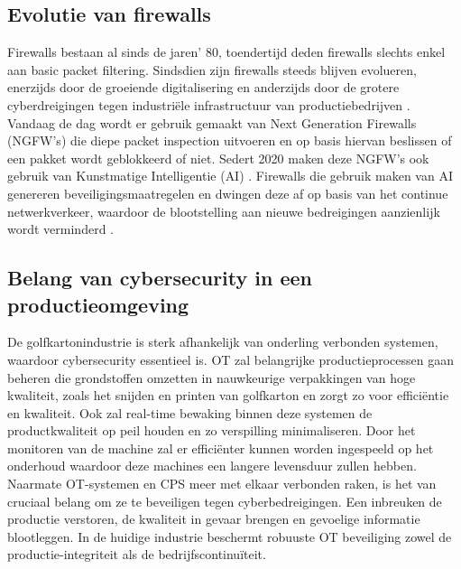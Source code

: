 \subsection{Evolutie van firewalls}
Firewalls bestaan al sinds de jaren’ 80, toendertijd deden firewalls slechts enkel aan basic packet filtering. Sindsdien zijn firewalls steeds blijven evolueren, enerzijds door de groeiende digitalisering en anderzijds door de grotere cyberdreigingen tegen industriële infrastructuur van productiebedrijven \autocite{Wusteney2021}. 
Vandaag de dag wordt er gebruik gemaakt van Next Generation Firewalls (NGFW’s) die diepe packet inspection uitvoeren en op basis hiervan beslissen of een pakket wordt geblokkeerd of niet. Sedert 2020 maken deze NGFW’s ook gebruik van Kunstmatige Intelligentie (AI) \textcite{Ahmadi2023}. Firewalls die gebruik maken van AI genereren beveiligingsmaatregelen en dwingen deze af op basis van het continue netwerkverkeer, waardoor de blootstelling aan nieuwe bedreigingen aanzienlijk wordt verminderd \textcite{PaloAltoFW2024}.

  
\subsection{Belang van cybersecurity in een productieomgeving}

De golfkartonindustrie is sterk afhankelijk van onderling verbonden systemen, waardoor cybersecurity essentieel is. OT zal belangrijke productieprocessen gaan beheren die grondstoffen omzetten in nauwkeurige verpakkingen van hoge kwaliteit, zoals het snijden en printen van golfkarton en zorgt zo voor efficiëntie en kwaliteit. Ook zal real-time bewaking binnen deze systemen de productkwaliteit op peil houden en zo verspilling minimaliseren. Door het monitoren van de machine zal er efficiënter kunnen worden ingespeeld op het onderhoud waardoor deze machines een langere levensduur zullen hebben. Naarmate OT-systemen en CPS meer met elkaar verbonden raken, is het van cruciaal belang om ze te beveiligen tegen cyberbedreigingen. Een inbreuken de productie verstoren, de kwaliteit in gevaar brengen en gevoelige informatie blootleggen. In de huidige industrie beschermt robuuste OT beveiliging zowel de productie-integriteit als de bedrijfscontinuïteit. \autocite{fefco2025}

